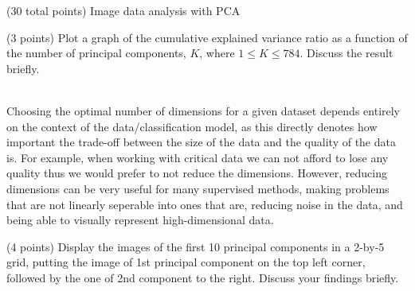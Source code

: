 \documentclass[12pt]{article}
\begin{document}
\begin{question}{(30 total points) Image data analysis with PCA}
\begin{subquestion}{(3 points)
       Plot a graph of the cumulative explained variance ratio as a function of the number of principal components, $K$, where $1\le K \le 784$.
       Discuss the result briefly.
     }
\begin{answerbox}{54em}
{\\
        Choosing the optimal number of dimensions for a given dataset depends entirely on the context of the data/classification model, as this directly denotes how important the trade-off between the size of the data and the quality of the data is. For example, when working with critical data we can not afford to lose any quality thus we would prefer to not reduce the dimensions. However, reducing dimensions can be very useful for many supervised methods, making problems that are not linearly seperable into ones that are, reducing noise in the data, and being able to visually represent high-dimensional data.
        }
      \end{answerbox}
  


   \end{subquestion}

   \begin{subquestion}{(4 points)
      Display the images of the first 10 principal components in
      a 2-by-5 grid, putting the image of 1st principal component on
      the top left corner, followed by the one of 2nd component to the right.
      Discuss your findings briefly.
     } \label{Q1.disp.pca}
   


\end{subquestion}
\end{question}
\end{document}
